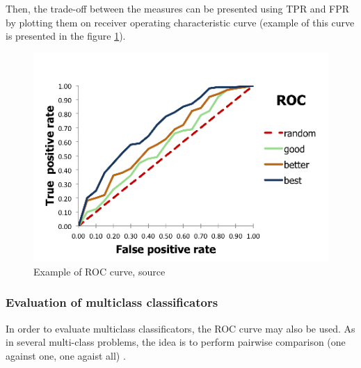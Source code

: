 Then, the trade-off between the measures can be presented using TPR and FPR by plotting them on receiver operating characteristic curve (example of this curve is presented in the figure \ref{roc-curve}).
\begin{figure}[H]
	\begin{center}
		\includegraphics[width=0.8\linewidth]{images/roc.png}
		\caption{Example of ROC curve, source \cite{roc-curve}}
		\label{roc-curve}
	\end{center}
\end{figure}
\subsubsection{Evaluation of multiclass classificators}
In order to evaluate multiclass classificators, the ROC curve may also be used. As in several multi-class problems, the idea is to perform pairwise comparison (one against one, one agaist all) \cite{multiclass-roc}. 

